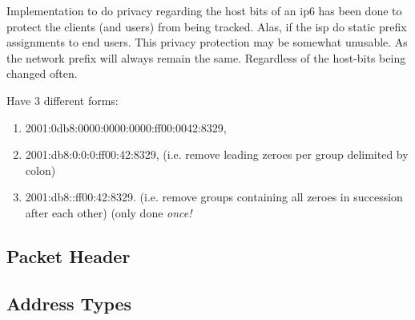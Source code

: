 Implementation to do privacy regarding the host bits of an \gls{ip6} has been done to protect the clients (and users) from being tracked. Alas, if the \gls{isp} do static prefix assignments to end users. This privacy protection may be somewhat unusable. As the network prefix will always remain the same. Regardless of the host-bits being changed often.

Have 3 different forms:
\begin{enumerate}
    \item 2001:0db8:0000:0000:0000:ff00:0042:8329,
    \item 2001:db8:0:0:0:ff00:42:8329, {\footnotesize (i.e. remove leading zeroes per group delimited by colon)}
    \item 2001:db8::ff00:42:8329. {\footnotesize (i.e. remove groups containing all zeroes in succession after each other) (only done \textit{once!}}
\end{enumerate}

\subsection{Packet Header}


\subsection{Address Types}

